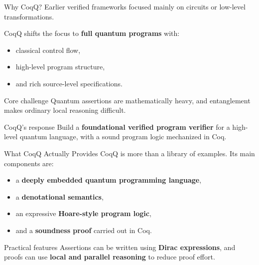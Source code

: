\documentclass[aspectratio=169]{beamer}
\begin{document}
\begin{frame}{Why CoqQ?}
\justifying
Earlier verified frameworks focused mainly on circuits or low-level transformations.

\vspace{0.7em}
CoqQ shifts the focus to \textbf{full quantum programs} with:
\begin{itemize}
    \item classical control flow,
    \item high-level program structure,
    \item and rich source-level specifications.
\end{itemize}

\vspace{0.7em}
\begin{block}{Core challenge}
Quantum assertions are mathematically heavy, and entanglement makes ordinary
local reasoning difficult.
\end{block}

\vspace{0.5em}
\begin{alertblock}{CoqQ's response}
Build a \textbf{foundational verified program verifier} for a high-level quantum language,
with a sound program logic mechanized in Coq.
\end{alertblock}
\end{frame}
\begin{frame}{What CoqQ Actually Provides}
\justifying
CoqQ is more than a library of examples. Its main components are:

\vspace{0.7em}
\begin{itemize}
    \item a \textbf{deeply embedded quantum programming language},
    \item a \textbf{denotational semantics},
    \item an expressive \textbf{Hoare-style program logic},
    \item and a \textbf{soundness proof} carried out in Coq.
\end{itemize}

\vspace{0.7em}
\begin{block}{Practical features}
Assertions can be written using \textbf{Dirac expressions}, and proofs can use
\textbf{local and parallel reasoning} to reduce proof effort.
\end{block}
\end{frame}
\end{document}
